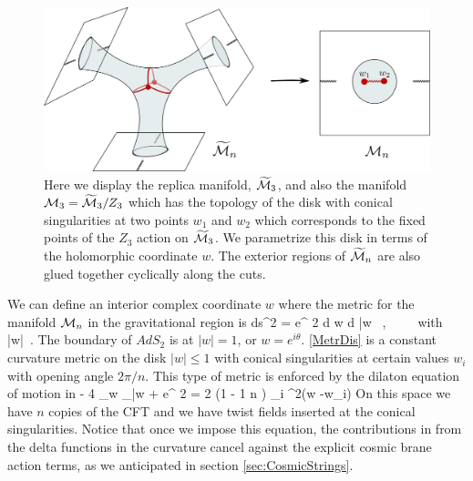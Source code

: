   \begin{figure}[t]
    \begin{center}
    \includegraphics[scale=0.65]{figures/threereplicas.png}
    \end{center}
    \caption{Here we display the replica manifold, $\widetilde {\cal M}_3$, 
    and also the manifold ${\cal M}_3 = \widetilde {\cal M}_3/Z_3$ which has the topology of the disk with conical singularities at two points $w_1$ and $w_2$ which corresponds to the fixed points of the $Z_3$ action on $\widetilde {\cal M}_3$. We parametrize this disk in terms of the holomorphic coordinate $w$. The exterior regions of $\widetilde{\cal M}_n$ are also glued together cyclically along the cuts. }
    \label{CoverThree}
\end{figure}

 
    
 We can define an interior 
  complex coordinate $w$ where the metric for the manifold ${\cal M}_n$ in the gravitational region is  
  \be
   ds^2 = e^{ 2 \rho } d w d \bar w   ~,~~~~~{\rm with} ~~ |w| \,. 
   \ee
   The boundary of $AdS_2$ is at $|w|=1$, or $w = e^{ i \theta} $.   
   \eqref{MetrDis} is a constant curvature metric on the disk $|w|\leq 1$ with conical singularities
   at certain values $w_i$ with opening angle $2\pi/n$. This type of metric is enforced by the dilaton equation of motion in  
  \be {}
 - 4 \partial_w \partial_{\bar w} \rho +
    e^{  2 \rho} = 2 \pi (1 - { 1 \over n } ) \sum_i \delta^2(w -w_i) 
   \ee
   On this space we have $n$ copies of 
   the CFT and we have twist fields inserted at the conical singularities. 
   Notice that once we impose this equation,  the contributions in      from the delta functions in the curvature cancel against the explicit cosmic brane action terms, as we anticipated in section \ref{sec:CosmicStrings}.    
   
